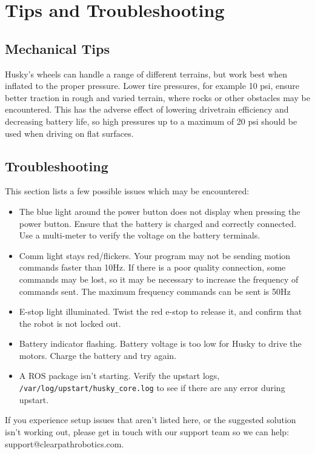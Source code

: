 \documentclass[]{clearpath-latex/clearpath-manual}
\begin{document}
\section{Tips and Troubleshooting}

\subsection{Mechanical Tips}
Husky’s wheels can handle a range of different terrains, but work best when inflated to the proper pressure. 
Lower tire pressures, for example 10 psi, ensure better traction in rough and varied terrain, where rocks or 
other obstacles may be encountered. This has the adverse effect of lowering drivetrain efficiency and decreasing 
battery life, so high pressures up to a maximum of 20 psi should be used when driving on flat surfaces. 

\subsection{Troubleshooting}

This section lists a few possible issues which may be encountered:

\begin{itemize}
	\item The blue light around the power button does not display when pressing the power button. Ensure that the battery is charged and correctly connected. Use a multi-meter to verify the voltage on the battery terminals.
	\item Comm light stays red/flickers. Your program may not be sending motion commands faster than 10Hz. If there is a poor quality connection, some commands may be lost, so it may be necessary to increase the frequency of commands sent. The maximum frequency commands can be sent is 50Hz
	\item E-stop light illuminated. Twist the red e-stop to release it, and confirm that the robot is not locked out.
	\item Battery indicator flashing. Battery voltage is too low for Husky to drive the motors. Charge the battery and try again.
	\item A ROS package isn't starting. Verify the upstart logs, \lstinline{/var/log/upstart/husky_core.log} to see if there are any error during upstart.
\end{itemize}
	
If you experience setup issues that aren’t listed here, or the suggested solution isn’t working out, please get in touch with our support team so we can help: support@clearpathrobotics.com.
\end{document}
